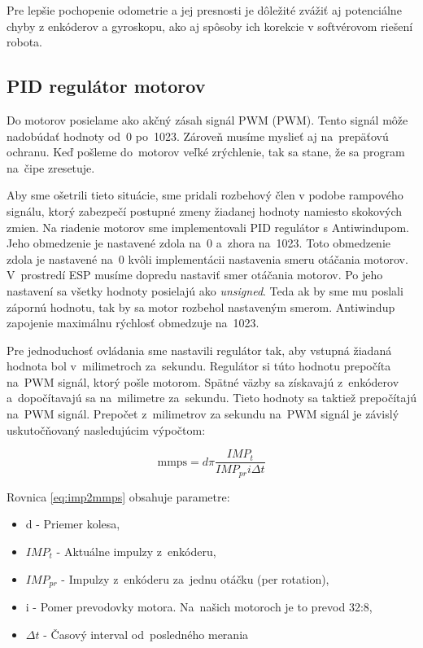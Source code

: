 Pre lepšie pochopenie odometrie a jej presnosti je dôležité zvážiť aj potenciálne chyby z enkóderov a gyroskopu, ako aj spôsoby ich korekcie v softvérovom riešení robota.


\newpage

\subsection{PID regulátor motorov}
\label{subsec:pid}

Do motorov posielame ako akčný zásah signál PWM (\acrlong{PWM}). Tento signál môže nadobúdať hodnoty od~0 po~1023.
Zároveň musíme myslieť aj na~prepäťovú ochranu. Keď pošleme do~motorov veľké zrýchlenie, tak sa stane, že sa program
na~čipe zresetuje.

Aby sme ošetrili tieto situácie, sme pridali rozbehový člen v podobe rampového signálu, ktorý zabezpečí postupné zmeny žiadanej hodnoty namiesto skokových zmien. Na riadenie motorov sme implementovali PID regulátor s Antiwindupom. 
Jeho obmedzenie je nastavené zdola na~0 a~zhora na~1023. Toto obmedzenie zdola je nastavené na~0 kvôli implementácii nastavenia smeru
otáčania motorov. V~prostredí ESP musíme dopredu nastaviť smer otáčania motorov. Po jeho nastavení sa všetky hodnoty
posielajú ako \textit{unsigned}. Teda ak by sme mu poslali zápornú hodnotu, tak by sa motor rozbehol nastaveným smerom.
Antiwindup zapojenie maximálnu rýchlosť obmedzuje na~1023.

Pre jednoduchosť ovládania sme nastavili regulátor tak, aby vstupná žiadaná hodnota bol v~milimetroch za~sekundu.
Regulátor si túto hodnotu prepočíta na~PWM signál, ktorý pošle motorom. Spätné väzby sa získavajú z~enkóderov
a~dopočítavajú sa na~milimetre za~sekundu. Tieto hodnoty sa taktiež prepočítajú na~PWM signál. Prepočet z~milimetrov
za sekundu na~PWM signál je závislý uskutočňovaný nasledujúcim výpočtom:

\begin{equation}
	\text{mmps} = d \pi \frac{IMP_t}{IMP_{pr} i \Delta t}
	\label{eq:imp2mmps}
\end{equation}

Rovnica \ref{eq:imp2mmps} obsahuje parametre:
\begin{itemize}
	\item d - Priemer kolesa,
	\item $IMP_t$ - Aktuálne impulzy z~enkóderu,
	\item $IMP_{pr}$ - Impulzy z~enkóderu za~jednu otáčku (per rotation),
	\item i - Pomer prevodovky motora. Na~našich motoroch je to prevod 32:8,
	\item $\Delta t$ - Časový interval od~posledného merania
\end{itemize}

